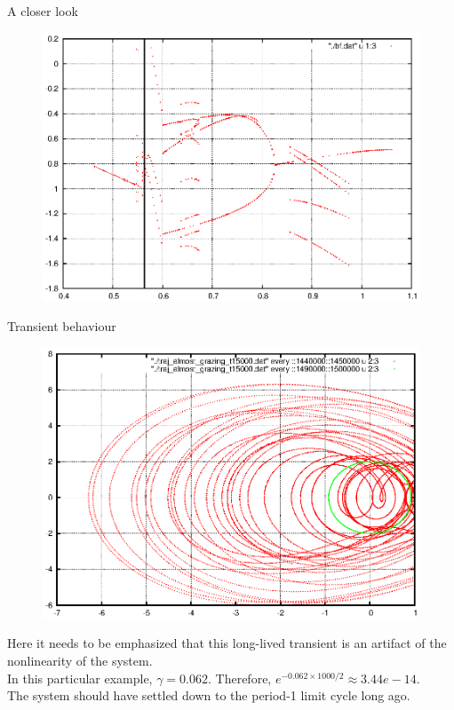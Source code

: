 \documentclass[xcolor=x11names,compress]{beamer}
\renewcommand{\(}{\begin{columns}}
\renewcommand{\)}{\end{columns}}
\newcommand{\<}[1]{\begin{column}{#1}}
\renewcommand{\>}{\end{column}}
\begin{document}
\begin{frame}{A closer look}
\begin{figure}
\begin{center}
\includegraphics[width=0.9\columnwidth]{short-zoomed}
\end{center}
\end{figure}
\end{frame}

\begin{frame}{Transient behaviour}
\begin{figure}
\begin{center}
\includegraphics[width=0.9\columnwidth]{comparison-transient-chaos}
\end{center}
\end{figure}
\end{frame}

\begin{frame}
Here it needs to be emphasized that this long-lived transient is an artifact 
of the nonlinearity of the system. \\

\vspace{1em}
In this particular example, $\gamma=0.062$.  Therefore, 
$e^{-0.062\times1000/2}\approx 3.44e-14$.  \\

\vspace{1em}
The system should have settled down to the period-1 limit cycle long ago.  \\
\end{frame}
\end{document}
